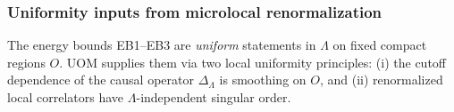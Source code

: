\documentclass[10pt]{article}
\theoremstyle{definition}
\theoremstyle{plain}
\begin{document}

\subsubsection*{Uniformity inputs from microlocal renormalization}

The energy bounds EB1--EB3 are \emph{uniform} statements in $\Lambda$ on fixed compact
regions $O$.  UOM supplies them via two local uniformity principles:
(i) the cutoff dependence of the causal operator $\Delta_\Lambda$ is smoothing on $O$,
and (ii) renormalized local correlators have $\Lambda$-independent singular order.
\end{document}
